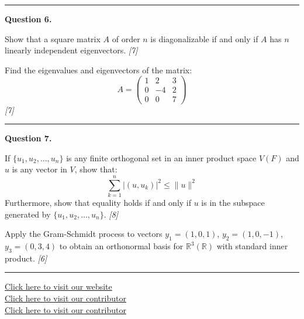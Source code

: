 \documentclass[11pt,a4paper]{article}
\newcommand{\pts}[1]{\hfill   \textit{[#1]}}
\begin{document}
\medskip\rule{\linewidth}{0.2pt}

\medskip


\noindent   \textbf{Question 6.}

\begin{parts}
  \item Show that a square matrix $A$ of order $n$ is diagonalizable if and only if $A$ has $n$ linearly independent eigenvectors. \pts{7}
  \item Find the eigenvalues and eigenvectors of the matrix:
  \[
  A = 
\begin{pmatrix} 1 & 2 & 3 \\ 0 & -4 & 2 \\ 0 & 0 & 7 \end{pmatrix}
  \] \pts{7}
\end{parts}

\medskip\rule{\linewidth}{0.2pt}

\medskip


\noindent   \textbf{Question 7.}

\begin{parts}
  \item If $\{u_1, u_2, \dots, u_n\}$ is any finite orthogonal set in an inner product space $V(F)$ and $u$ is any vector in $V$, show that:
  \[
  \sum_{k=1}^n |(u, u_k)|^2 \le \|u\|^2
  \]
  Furthermore, show that equality holds if and only if $u$ is in the subspace generated by $\{u_1, u_2, \dots, u_n\}$. \pts{8}
  \item Apply the Gram-Schmidt process to vectors $y_1 = (1,0,1)$, $y_2 = (1,0,-1)$, $y_3 = (0,3,4)$ to obtain an orthonormal basis for $\mathbb{R}^3(\mathbb{R})$ with standard inner product. \pts{6}
\end{parts}

\vfill
\rule{\linewidth}{0.4pt}

\begin{center}\small
  \href{https://bhu-exam.vercel.app/}{Click here to visit our website}\\[4pt]
  \href{https://me-aryan.vercel.app/}{Click here to visit our contributor}\\[4pt]
  \href{https://quashan-me.vercel.app/}{Click here to visit our contributor}
\end{center}
\end{document}
